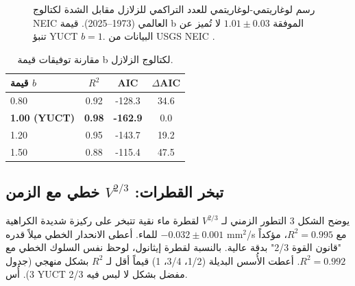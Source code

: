 \documentclass[11pt,a4paper]{article}
\begin{document}
	\begin{otherlanguage}{english}
		\begin{figure}[htbp]
			\centering
			\caption{رسم لوغاريتمي-لوغاريتمي للعدد التراكمي للزلازل مقابل الشدة لكتالوج NEIC العالمي (1973–2025). قيمة b الموفقة \(1.01 \pm 0.03\) لا تُميز عن تنبؤ YUCT \(b = 1\). البيانات من USGS NEIC \cite{USGSNEIC}.}
			\label{fig:earthquakes}
		\end{figure}
		
		\begin{table}[htbp]
			\centering
			\caption{مقارنة توفيقات قيمة b لكتالوج الزلازل.}
			\label{tab:earthquakes}
			\begin{tabular}{lccc}
				\toprule
				\textbf{قيمة \(b\)} & \(R^2\) & AIC & \(\Delta\)AIC \\
				\midrule
				0.80 & 0.92 & -128.3 & 34.6 \\
				\textbf{1.00 (YUCT)} & \textbf{0.98} & \textbf{-162.9} & 0.0 \\
				1.20 & 0.95 & -143.7 & 19.2 \\
				1.50 & 0.88 & -115.4 & 47.5 \\
				\bottomrule
			\end{tabular}
		\end{table}
	\end{otherlanguage}
	
	\subsection{تبخر القطرات: \(V^{2/3}\) خطي مع الزمن}
	
	يوضح الشكل 3 التطور الزمني لـ \(V^{2/3}\) لقطرة ماء نقية تتبخر على ركيزة شديدة الكراهية للماء. أعطى الانحدار الخطي ميلاً قدره \(-0.032 \pm 0.001\) mm\(^2\)/s مع \(R^2 = 0.995\)، مؤكداً "قانون القوة 2/3" بدقة عالية. بالنسبة لقطرة إيثانول، لوحظ نفس السلوك الخطي مع \(R^2 = 0.992\). أعطت الأُسس البديلة (1/2، 3/4، 1) قيماً أقل لـ \(R^2\) بشكل منهجي (جدول 3). أُس YUCT 2/3 مفضل بشكل لا لبس فيه.
	
\end{document}
